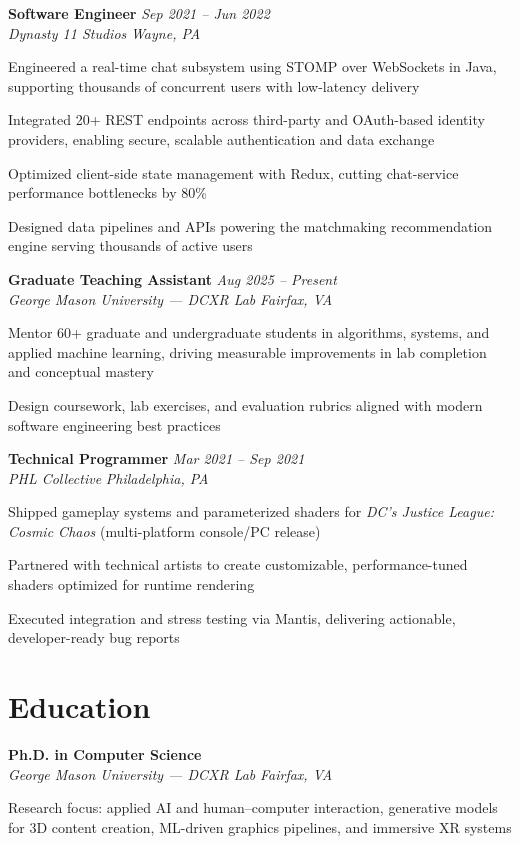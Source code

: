 \documentclass[letterpaper,10pt]{article}
\newcommand{\role}[4]{%
  \textbf{#1} \hfill \textit{#3}\\[-1pt]
  \textit{#2} \hfill \textit{#4}\par\vspace{2pt}
}
\newcommand{\education}[4]{%
  \textbf{#1} \hfill \textit{#3}\\[-1pt]
  \textit{#2} \hfill \textit{#4}\par\vspace{2pt}
}
\begin{document}
\role{Software Engineer}{Dynasty 11 Studios}{Sep 2021 -- Jun 2022}{Wayne, PA}
\begin{tightitemize}
  \item Engineered a real-time chat subsystem using STOMP over WebSockets in Java, supporting thousands of concurrent users with low-latency delivery
  \item Integrated 20+ REST endpoints across third-party and OAuth-based identity providers, enabling secure, scalable authentication and data exchange
  \item Optimized client-side state management with Redux, cutting chat-service performance bottlenecks by 80\%
  \item Designed data pipelines and APIs powering the matchmaking recommendation engine serving thousands of active users
\end{tightitemize}

\role{Graduate Teaching Assistant}{George Mason University --- DCXR Lab}{Aug 2025 -- Present}{Fairfax, VA}
\begin{tightitemize}
  \item Mentor 60+ graduate and undergraduate students in algorithms, systems, and applied machine learning, driving measurable improvements in lab completion and conceptual mastery
  \item Design coursework, lab exercises, and evaluation rubrics aligned with modern software engineering best practices
\end{tightitemize}

\role{Technical Programmer}{PHL Collective}{Mar 2021 -- Sep 2021}{Philadelphia, PA}
\begin{tightitemize}
  \item Shipped gameplay systems and parameterized shaders for \textit{DC's Justice League: Cosmic Chaos} (multi-platform console/PC release)
  \item Partnered with technical artists to create customizable, performance-tuned shaders optimized for runtime rendering
  \item Executed integration and stress testing via Mantis, delivering actionable, developer-ready bug reports
\end{tightitemize}

\section*{Education}
\education{Ph.D. in Computer Science}{George Mason University --- DCXR Lab}{}{Fairfax, VA}
\begin{tightitemize}
  \item Research focus: applied AI and human--computer interaction, generative models for 3D content creation, ML-driven graphics pipelines, and immersive XR systems
\end{tightitemize}
\end{document}

